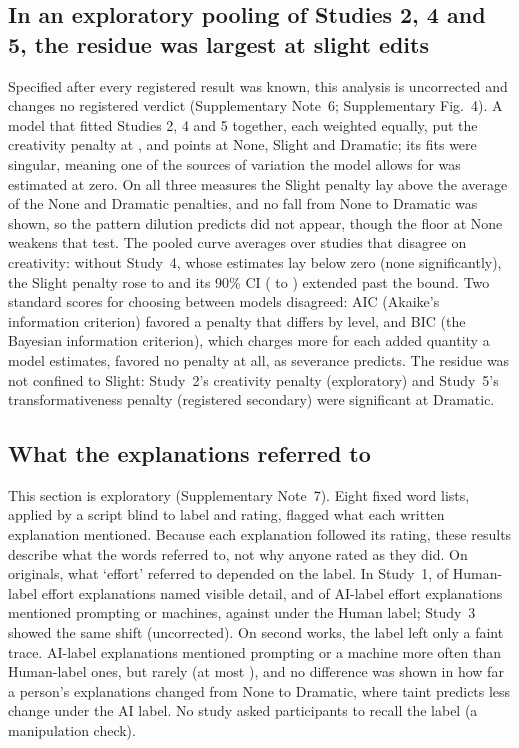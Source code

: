 \subsection*{In an exploratory pooling of Studies 2, 4 and 5, the residue was largest at slight edits}

Specified after every registered result was known, this analysis is uncorrected and changes no registered verdict (Supplementary Note~6; Supplementary Fig.~4). A model that fitted Studies 2, 4 and 5 together, each weighted equally, put the creativity penalty at \XSCreatPenaltyNoneEst, \XSCreatPenaltySlightEst{} and \XSCreatPenaltyDramaticEst{} points at None, Slight and Dramatic; its fits were singular, meaning one of the sources of variation the model allows for was estimated at zero. On all three measures the Slight penalty lay above the average of the None and Dramatic penalties, and no fall from None to Dramatic was shown, so the pattern dilution predicts did not appear, though the floor at None weakens that test. The pooled curve averages over studies that disagree on creativity: without Study~4, whose estimates lay below zero (none significantly), the Slight penalty rose to \XSCreatPenaltyWithoutSFourSlightEst{} and its 90\% CI (\XSCreatPenaltyWithoutSFourSlightLoNinety{} to \XSCreatPenaltyWithoutSFourSlightHiNinety) extended past the bound. Two standard scores for choosing between models disagreed: AIC (Akaike's information criterion) favored a penalty that differs by level, and BIC (the Bayesian information criterion), which charges more for each added quantity a model estimates, favored no penalty at all, as severance predicts. The residue was not confined to Slight: Study~2's creativity penalty (exploratory) and Study~5's transformativeness penalty (registered secondary) were significant at Dramatic.

\subsection*{What the explanations referred to}

This section is exploratory (Supplementary Note~7). Eight fixed word lists, applied by a script blind to label and rating, flagged what each written explanation mentioned. Because each explanation followed its rating, these results describe what the words referred to, not why anyone rated as they did. On originals, what `effort' referred to depended on the label. In Study~1, \SOneTextEffortDetailPct{} of Human-label effort explanations named visible detail, and \SOneTextPromptEffortAIPct{} of AI-label effort explanations mentioned prompting or machines, against \SOneTextPromptEffortHumanPct{} under the Human label; Study~3 showed the same shift (uncorrected). On second works, the label left only a faint trace. AI-label explanations mentioned prompting or a machine more often than Human-label ones, but rarely (at most \XSOriginTalkAIDramaticPct), and no difference was shown in how far a person's explanations changed from None to Dramatic, where taint predicts less change under the AI label. No study asked participants to recall the label (a manipulation check).
